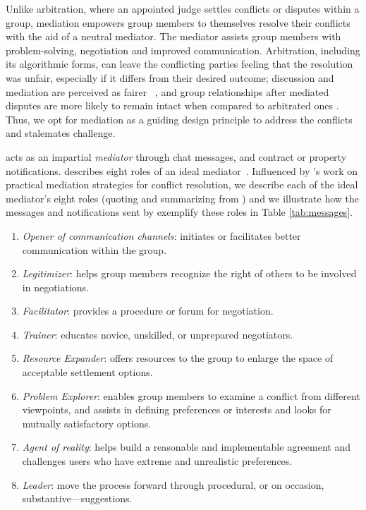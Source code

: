 


\pMediation Unlike arbitration, where an appointed judge settles conflicts or disputes within a group, mediation empowers group members to themselves resolve their conflicts with the aid of a neutral mediator. The mediator assists group members with problem-solving, negotiation and improved communication. Arbitration, including its algorithmic forms, can leave the conflicting parties feeling that the resolution was unfair, especially if it differs from their desired outcome; discussion and mediation are perceived as fairer ~\cite{algorithmicmediation}, and group relationships after mediated disputes are more likely to remain intact when compared to arbitrated ones \cite{disputeresolutionexplanation2}. Thus, we opt for mediation as a guiding design principle to address the conflicts and stalemates challenge.

\cbot acts as an impartial \textit{mediator} through chat messages, and contract or property notifications. \citeauthor{themediationprocess} describes eight roles of an ideal mediator~\cite{themediationprocess}. Influenced by \citeauthor{themediationprocess}'s work on practical mediation strategies for conflict resolution, we describe each of the ideal mediator's eight roles (quoting and summarizing from \cite{themediationprocess}) and we illustrate how the messages and notifications sent by \cbot exemplify these roles in Table \ref{tab:messages}. 



\begin{enumerate}
    \item \textit{Opener of communication channels}: initiates or facilitates better communication within the group. 


    \item \textit{Legitimizer}: helps group members recognize the right of others to be involved in negotiations.

    
    \item \textit{Facilitator}: provides a procedure or forum for negotiation.

    
\item \textit{Trainer}: educates novice, unskilled, or unprepared negotiators.


\item \textit{Resource Expander}: offers resources to the group to enlarge the space of acceptable settlement options.

    
\item \textit{Problem Explorer}: enables group members to examine a conflict from different viewpoints, and assists in defining preferences or interests and looks for mutually satisfactory options.

    
\item \textit{Agent of reality}: helps build a reasonable and implementable agreement and challenges users who have extreme and unrealistic preferences.


\item \textit{Leader}: move the process forward through procedural, or on occasion, substantive—suggestions.
\end{enumerate}




